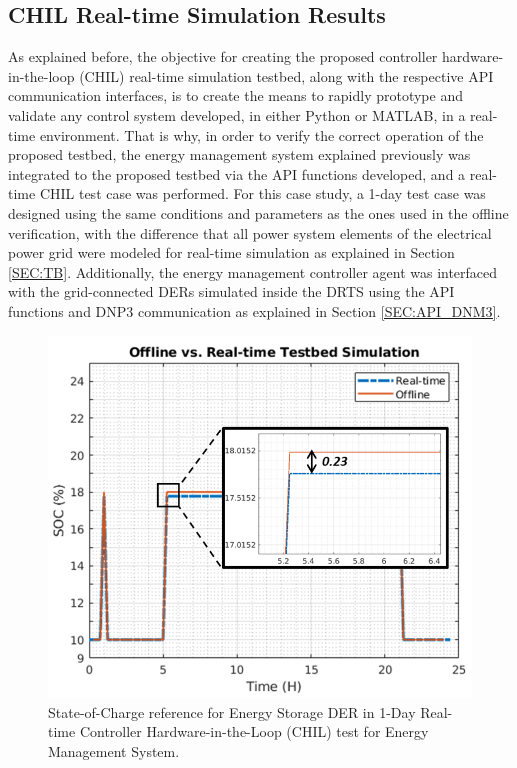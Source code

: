 
\subsection{CHIL Real-time Simulation Results}

As explained before, the objective for creating the proposed controller hardware-in-the-loop (CHIL) real-time simulation testbed, along with the respective API communication interfaces, is to create the means to rapidly prototype and validate any control system developed, in either Python or MATLAB, in a real-time environment. That is why, in order to verify the correct operation of the proposed testbed, the energy management system explained previously was integrated to the proposed testbed via the API functions developed, and a real-time CHIL test case was performed. For this case study, a 1-day test case was designed using the same conditions and parameters as the ones used in the offline verification, with the difference that all power system elements of the electrical power grid were modeled for real-time simulation as explained in Section \ref{SEC:TB}. Additionally,  the energy management controller agent was interfaced with the grid-connected DERs simulated inside the DRTS using the API functions and DNP3 communication as explained in Section \ref{SEC:API_DNM3}. 

\begin{figure}[!ht]
    \centering
    \includegraphics[width = 0.6\linewidth]{figs_juan/realtime_2.png}
    \caption{State-of-Charge reference for Energy Storage DER in 1-Day Real-time Controller Hardware-in-the-Loop (CHIL) test for Energy Management System.}
    \label{fig:realtime}
    \vspace{-1mm}
\end{figure}

